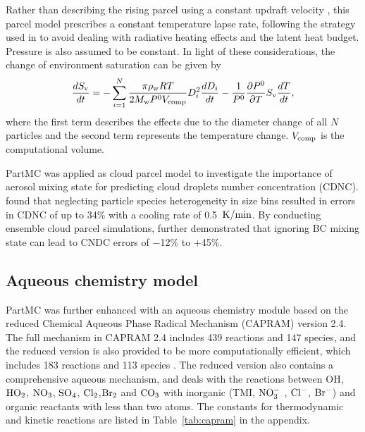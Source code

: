 \documentclass[edeposit,fullpage]{uiucthesis2009}
\makeatletter
\DeclareRobustCommand*\unit[1]
 {\ensuremath{%
   {\thinmuskip3mu\relax
    \def\mu{\text{\textmu}}\def~{\,}%
    \ifx\f@series\testbx\mathbf{#1}\else\mathrm{#1}\fi}}}
\makeatother
\begin{document}
Rather than describing the rising parcel using a constant updraft
velocity \citep{Seinfeld2016,rothenberg2016metamodeling}, this parcel
model prescribes a constant temperature lapse rate, following the
strategy used in \citet{majeed2001microphysics} to avoid dealing with
radiative heating effects and the latent heat budget. Pressure is also
assumed to be constant. In light of these considerations, the change
of environment saturation can be given by
\begin{equation}
    \centering
    \frac{dS_{\rm v}}{dt} = -\sum_{i=1}^{N}\frac{\pi \rho_{\rm w} RT}{2M_{\rm w}P^0V_{\rm comp}}D_i^2\frac{dD_i}{dt} - \frac{1}{P^0}\frac{\partial P^0}{\partial T}S_{\rm v}\frac{dT}{dt},
\end{equation}
where the first term describes the effects due to the diameter change
of all $N$ particles and the second term represents the temperature
change. $V_{\rm comp}$ is the computational volume.

PartMC was applied as cloud parcel model to investigate the importance
of aerosol mixing state for predicting cloud droplets number
concentration (CDNC). \citet{ching2012impacts} found that neglecting
particle species heterogeneity in size bins resulted in errors in CDNC
of up to 34\% with a cooling rate of 0.5~\unit{K/min}. By conducting
ensemble cloud parcel simulations, \citet{Ching2016} further
demonstrated that ignoring BC mixing state can lead to CNDC errors of
$-$12\% to $+$45\%.


\subsection{Aqueous chemistry model}
\label{section:aq-chem-model}
PartMC was further enhanced with an aqueous chemistry module based on
the reduced Chemical Aqueous Phase Radical Mechanism (CAPRAM) version
2.4. The full mechanism in CAPRAM 2.4 includes 439 reactions and 147
species, and the reduced version is also provided to be more
computationally efficient, which includes 183 reactions and 113
species \citep{Ervens2003}. The reduced version also contains a
comprehensive aqueous mechanism, and deals with the reactions between
OH, $\rm HO_2$, $\rm NO_3$, $\rm SO_4$, $\rm Cl_2$,$\rm Br_2$ and $\rm
CO_3$ with inorganic (TMI, $\rm NO_3^-$ , $\rm Cl^-$, $\rm Br^-$) and
organic reactants with less than two atoms. The constants for
thermodynamic and kinetic reactions are listed in
Table~\ref{tab:capram} in the appendix. 
\end{document}
